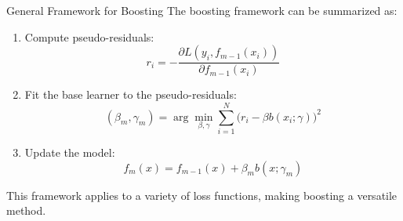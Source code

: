 \documentclass{beamer}
\begin{document}
\begin{frame}{General Framework for Boosting}
    The boosting framework can be summarized as:
    \begin{enumerate}
        \item Compute pseudo-residuals:
        \[
        r_i = -\frac{\partial L(y_i, f_{m-1}(x_i))}{\partial f_{m-1}(x_i)}
        \]
        \item Fit the base learner to the pseudo-residuals:
        \[
        (\beta_m, \gamma_m) = \arg\min_{\beta, \gamma} \sum_{i=1}^N \Big( r_i - \beta b(x_i; \gamma) \Big)^2
        \]
        \item Update the model:
        \[
        f_m(x) = f_{m-1}(x) + \beta_m b(x; \gamma_m)
        \]
    \end{enumerate}
    This framework applies to a variety of loss functions, making boosting a versatile method.
\end{frame}
\end{document}
